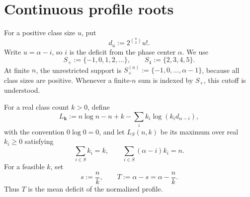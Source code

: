 
\section{Continuous profile roots}
\label{continuous-profile-roots}

For a positive class size $u$, put
\[
  d_u:=2^{\binom u2}u!.
\]
Write $u=\alpha-i$, so $i$ is the deficit from the phase center $\alpha$.
We use
\begin{equation*}
  S_+:=\{-1,0,1,2,\ldots\},
  \qquad
  S_4:=\{2,3,4,5\}.
  \tag{3.1}
\end{equation*}
At finite $n$, the unrestricted support is
$S_+^{(n)}:=\{-1,0,\ldots,\alpha-1\}$, because all class sizes are
positive. Whenever a finite-$n$ sum is indexed by $S_+$, this cutoff is
understood.

For a real class count $k>0$, define
\begin{equation*}
  L_{\mathbf k}
  :=n\log n-n+k-\sum_i k_i\log(k_i d_{\alpha-i}),
  \tag{3.2}
\end{equation*}
with the convention $0\log0=0$, and let $L_S(n,k)$ be its maximum over
real $k_i\ge0$ satisfying
\begin{equation*}
  \sum_{i\in S}k_i=k,
  \qquad
  \sum_{i\in S}(\alpha-i)k_i=n.
  \tag{3.3}
\end{equation*}
For a feasible $k$, set
\begin{equation*}
  s:=\frac nk,
  \qquad
  T:=\alpha-s=\alpha-\frac nk.
  \tag{3.4}
\end{equation*}
Thus $T$ is the mean deficit of the normalized profile.

